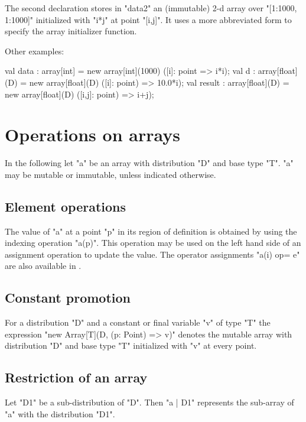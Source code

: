 The second declaration stores in \xcd"data2" an (immutable)
2-d array over \xcd"[1:1000, 1:1000]" initialized with \xcd"i*j"
at point \xcd"[i,j]". It uses a more abbreviated form to specify 
the array initializer function.

Other examples:
\begin{xten}
val data : array[int]
    = new array[int](1000)
        ([i]: point => i*i);
val d : array[float](D)
   = new array[float](D) ([i]: point) => 10.0*i);
val result : array[float](D)
   = new array[float](D) ([i,j]: point) => i+j);
\end{xten}

\section{Operations on arrays}
In the following let \xcd"a" be an array with distribution \xcd"D" and
base type \xcd"T". \xcd"a" may be mutable or immutable, unless
indicated otherwise.

\subsection{Element operations}
The value of \xcd"a" at a point \xcd"p" in its region of definition is
obtained by using the indexing operation \xcd"a(p)". This operation
may be used on the left hand side of an assignment operation to update
the value. The operator assignments \xcd"a(i) op= e" are also available
in \Xten{}.

\subsection{Constant promotion}\label{ConstantArray}

For a distribution \xcd"D" and a constant or final variable \xcd"v" of
type \xcd"T" the expression \xcd"new Array[T](D, (p: Point) => v)"
denotes the mutable array with
distribution \xcd"D" and base type \xcd"T" initialized with \xcd"v"
at every point.

\subsection{Restriction of an array}

Let \xcd"D1" be a sub-distribution of \xcd"D". Then \xcd"a | D1"
represents the sub-array of \xcd"a" with the distribution \xcd"D1".

